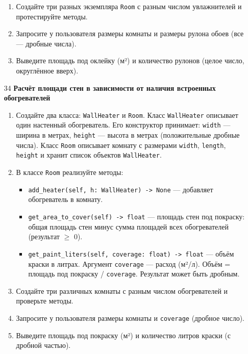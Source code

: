 \begin{enumerate}
\begin{enumerate}
    \item Создайте три разных экземпляра \texttt{Room} с разным числом увлажнителей и протестируйте методы.

    \item Запросите у пользователя размеры комнаты и размеры рулона обоев (все — дробные числа).

    \item Выведите площадь под оклейку (м²) и количество рулонов (целое число, округлённое вверх).
\end{enumerate}

\item[34] \textbf{Расчёт площади стен в зависимости от наличия встроенных обогревателей}
\begin{enumerate}
    \item Создайте два класса: \texttt{WallHeater} и \texttt{Room}.  
    Класс \texttt{WallHeater} описывает один настенный обогреватель. Его конструктор принимает:  
    \texttt{width} — ширина в метрах,  
    \texttt{height} — высота в метрах (положительные дробные числа).  
    Класс \texttt{Room} описывает комнату с размерами \texttt{width}, \texttt{length}, \texttt{height} и хранит список объектов \texttt{WallHeater}.

    \item В классе \texttt{Room} реализуйте методы:  
    \begin{itemize}
        \item \texttt{add\_heater(self, h: WallHeater) -> None} — добавляет обогреватель в комнату.
        \item \texttt{get\_area\_to\_cover(self) -> float} — площадь стен под покраску: общая площадь стен минус сумма площадей всех обогревателей (результат $\geqslant$ 0).
        \item \texttt{get\_paint\_liters(self, coverage: float) -> float} — объём краски в литрах. Аргумент \texttt{coverage} — расход (м²/л). Объём = площадь под покраску / \texttt{coverage}. Результат может быть дробным.
    \end{itemize}

    \item Создайте три различных комнаты с разным числом обогревателей и проверьте методы.

    \item Запросите у пользователя размеры комнаты и \texttt{coverage} (дробное число).

    \item Выведите площадь под покраску (м²) и количество литров краски (с дробной частью).
\end{enumerate}


\end{enumerate}
